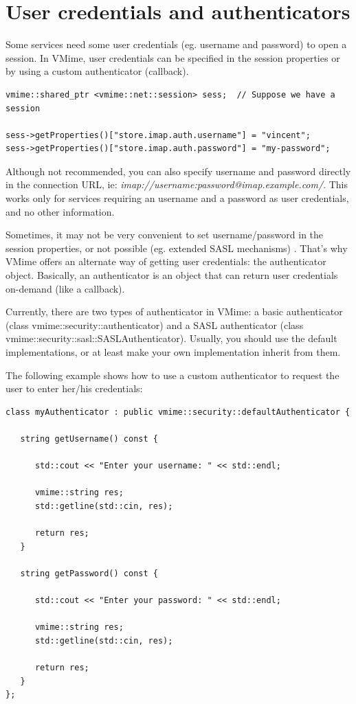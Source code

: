\section{User credentials and authenticators}

Some services need some user credentials (eg. username and password) to open
a session. In VMime, user credentials can be specified in the session
properties or by using a custom authenticator (callback).

\begin{lstlisting}[caption={Setting user credentials using session
properties}]
vmime::shared_ptr <vmime::net::session> sess;  // Suppose we have a session

sess->getProperties()["store.imap.auth.username"] = "vincent";
sess->getProperties()["store.imap.auth.password"] = "my-password";
\end{lstlisting}

Although not recommended, you can also specify username and password
directly in the connection URL,
ie: \emph{imap://username:password@imap.example.com/}. This works only for
services requiring an username and a password as user credentials, and no
other information.

Sometimes, it may not be very convenient to set username/password in the
session properties, or not possible (eg. extended SASL mechanisms) . That's
why VMime offers an alternate way of getting user credentials: the
{\vcode authenticator} object. Basically, an authenticator is an object that
can return user credentials on-demand (like a callback).

Currently, there are two types of authenticator in VMime: a basic
authenticator (class {\vcode vmime::security::authenticator}) and a SASL
authenticator (class {\vcode vmime::security::sasl::SASLAuthenticator}).
Usually, you
should use the default implementations, or at least make your own
implementation inherit from them.

The following example shows how to use a custom authenticator to request
the user to enter her/his credentials:

\begin{lstlisting}[caption={A simple interactive authenticator}]
class myAuthenticator : public vmime::security::defaultAuthenticator {

   string getUsername() const {

      std::cout << "Enter your username: " << std::endl;

      vmime::string res;
      std::getline(std::cin, res);

      return res;
   }

   string getPassword() const {

      std::cout << "Enter your password: " << std::endl;

      vmime::string res;
      std::getline(std::cin, res);

      return res;
   }
};
\end{lstlisting}

